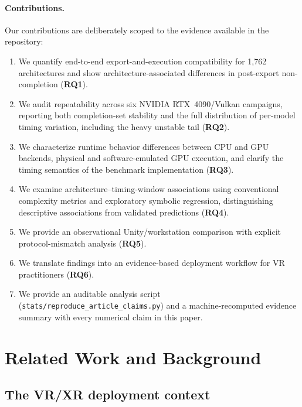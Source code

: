 \documentclass[10pt,twocolumn]{article}
\begin{document}
\paragraph{Contributions.}
Our contributions are deliberately scoped to the evidence available in the repository:
\begin{enumerate}[nosep,leftmargin=*]
  \item We quantify end-to-end export-and-execution compatibility for 1,762 architectures and show architecture-associated differences in post-export non-completion (\textbf{RQ1}).
  \item We audit repeatability across six NVIDIA RTX~4090/Vulkan campaigns, reporting both completion-set stability and the full distribution of per-model timing variation, including the heavy unstable tail (\textbf{RQ2}).
  \item We characterize runtime behavior differences between CPU and GPU backends, physical and software-emulated GPU execution, and clarify the timing semantics of the benchmark implementation (\textbf{RQ3}).
  \item We examine architecture--timing-window associations using conventional complexity metrics and exploratory symbolic regression, distinguishing descriptive associations from validated predictions (\textbf{RQ4}).
  \item We provide an observational Unity/workstation comparison with explicit protocol-mismatch analysis (\textbf{RQ5}).
  \item We translate findings into an evidence-based deployment workflow for VR practitioners (\textbf{RQ6}).
  \item We provide an auditable analysis script (\texttt{stats/reproduce\_article\_claims.py}) and a machine-recomputed evidence summary with every numerical claim in this paper.
\end{enumerate}

\section{Related Work and Background}\label{sec:background}

\subsection{The VR/XR deployment context}
\end{document}
